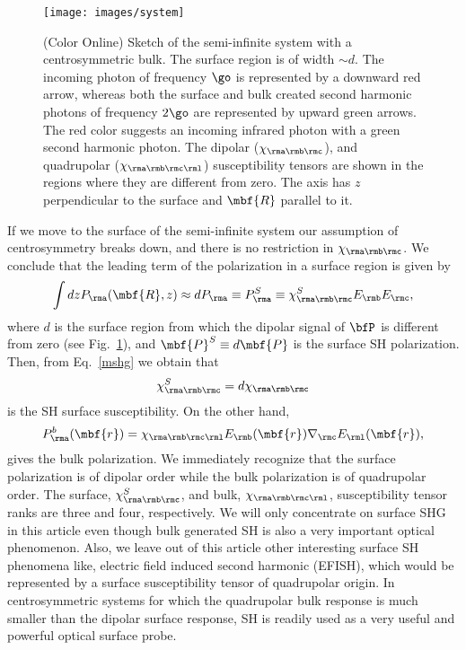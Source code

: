 \documentclass[floatfix,prb,aps,superscriptaddress,11pt,preprint,letterpaper]{revtex4}
\begin{document}
\begin{figure}[t]
\centering
\texttt{[image: images/system]}
\caption{(Color Online) Sketch of the semi-infinite system with a 
centrosymmetric bulk. The surface region is of width $\sim d$. 
The incoming photon of frequency $\go$ is represented by
a downward red arrow, whereas both the surface and bulk created second
harmonic photons of frequency $2\go$ are represented by upward
green arrows. The red color suggests an incoming infrared photon with
a green second harmonic photon. The dipolar ($\chi_{\rma\rmb\rmc}$), and 
quadrupolar ($\chi_{\rma\rmb\rmc\rml}$) susceptibility tensors are shown 
in the regions where they are different from zero. The axis has $z$
perpendicular to the surface and $\mbf{R}$ parallel to it.\label{fsystem}}
\end{figure}

If we move to the surface of the semi-infinite system our assumption 
of centrosymmetry breaks down, and there is no restriction in 
$\chi_{\rma\rmb\rmc}$. We conclude that the leading term
of the polarization in a surface region is given by
\begin{align}\label{sshgp1}
\int dz 
P_{\rma}(\mbf{R},z)
\approx dP_{\rma}
\equiv
P_{\rma}^S
\equiv
\chi^S_{\rma\rmb\rmc}E_{\rmb}E_{\rmc},
\end{align}
where
$d$ is the
surface region from which the dipolar signal of $\bfP$ is
different from zero (see Fig.~\ref{fsystem}), and
$\mbf{P}^S\equiv d\mbf{P}$
 is the surface SH polarization. Then, from Eq.~\eqref{mshg} we obtain that
\begin{align}\label{sshgp2}
\chi_{\rma\rmb\rmc}^S=d\chi_{\rma\rmb\rmc}
\end{align}
is the
SH surface susceptibility. 
On the other hand, 
\begin{equation}\label{sshgp3}
P^b_{\rma}(\mbf{r})=\chi_{\rma\rmb\rmc\rml}E_{\rmb}(\mbf{r})\nabla_{\rmc}
E_{\rml}(\mbf{r}),  
\end{equation}
gives the bulk polarization. We immediately recognize that the surface
polarization is of dipolar order while the bulk polarization is of
quadrupolar order. The surface, $\chi^S_{\rma\rmb\rmc}$, and bulk, 
$\chi_{\rma\rmb\rmc\rml}$, susceptibility tensor ranks are three and 
four, respectively. We will only concentrate on surface SHG in this article 
even though bulk generated SH is also a very important optical phenomenon. 
Also, we leave out of this article other interesting surface SH phenomena like, electric field
induced second harmonic (EFISH), which would be represented by a
surface susceptibility  tensor of quadrupolar origin.
In centrosymmetric systems for which the quadrupolar bulk
response is much smaller than the dipolar surface response, SH is
readily used as a very useful and powerful 
optical surface probe.\cite{downer_optical_2001}
\end{document}
